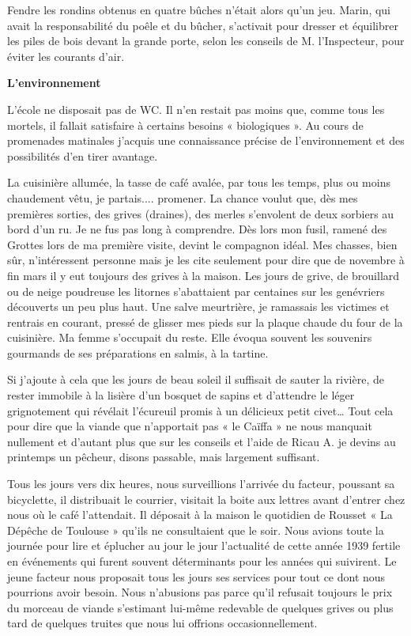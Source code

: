 Fendre les rondins obtenus en quatre bûches n’était alors qu’un jeu. Marin, qui avait
la responsabilité du poêle et du bûcher, s’activait pour dresser et équilibrer les piles
de bois devant la grande porte, selon les conseils de M. l’Inspecteur, pour éviter les
courants d’air.

\textbf{L’environnement}

L’école ne disposait pas de WC. Il n’en restait pas moins que, comme tous les
mortels, il fallait satisfaire à certains besoins « biologiques ». Au cours de
promenades matinales j’acquis une connaissance précise de l’environnement et des
possibilités d’en tirer avantage.

La cuisinière allumée, la tasse de café avalée, par tous les temps, plus ou moins
chaudement vêtu, je partais.... promener. La chance voulut que, dès mes premières
sorties, des grives (draines), des merles s’envolent de deux sorbiers au bord d’un ru.
Je ne fus pas long à comprendre. Dès lors mon fusil, ramené des Grottes lors de ma
première visite, devint le compagnon idéal. Mes chasses, bien sûr, n’intéressent
personne mais je les cite seulement pour dire que de novembre à fin mars il y eut
toujours des grives à la maison. Les jours de grive, de brouillard ou de neige
poudreuse les litornes s’abattaient par centaines sur les genévriers découverts un peu
plus haut. Une salve meurtrière, je ramassais les victimes et rentrais en courant,
pressé de glisser mes pieds sur la plaque chaude du four de la cuisinière. Ma femme
s’occupait du reste. Elle évoqua souvent les souvenirs gourmands de ses préparations
en salmis, à la tartine.


Si j’ajoute à cela que les jours de beau soleil il suffisait de sauter la rivière, de rester
immobile à la lisière d’un bosquet de sapins et d’attendre le léger grignotement qui
révélait l’écureuil promis à un délicieux petit civet… Tout cela pour dire que la
viande que n’apportait pas « le Caïffa » ne nous manquait nullement et d’autant plus
que sur les conseils et l’aide de Ricau A. je devins au printemps un pêcheur, disons
passable, mais largement suffisant.

Tous les jours vers dix heures, nous surveillions l’arrivée du facteur, poussant sa
bicyclette, il distribuait le courrier, visitait la boite aux lettres avant d’entrer chez
nous où le café l’attendait. Il déposait à la maison le quotidien de Rousset « La
Dépêche de Toulouse » qu’ils ne consultaient que le soir. Nous avions toute la
journée pour lire et éplucher au jour le jour l’actualité de cette année 1939 fertile en
événements qui furent souvent déterminants pour les années qui suivirent. Le jeune
facteur nous proposait tous les jours ses services pour tout ce dont nous pourrions
avoir besoin. Nous n’abusions pas parce qu’il refusait toujours le prix du morceau de
viande s’estimant lui-même redevable de quelques grives ou plus tard de quelques
truites que nous lui offrions occasionnellement.

